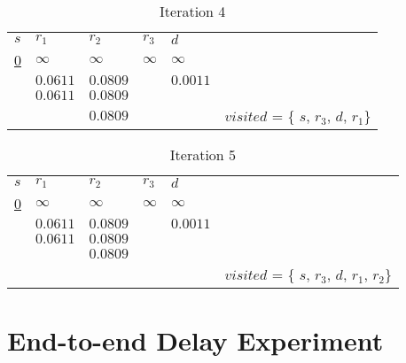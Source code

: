 \documentclass[conference]{IEEEtran}
\begin{document}
\begin{table}[!htbp]
\caption{Iteration 4}
\begin{tabular}{|l|l|l|l|l|l}
\cline{1-5}
$s$     & $r_1$          & $r_2$    & $r_3$            & $d$            &                                         \\ \cline{1-5}
{\ul 0} & $\infty$       & $\infty$ & $\infty$         & $\infty$       &                                         \\ \cline{1-5}
        & $0.0611$       & $0.0809$ & {\ul $0.000541$} & $0.0011$       &                                         \\ \cline{1-5}
        & $0.0611$       & $0.0809$ &                  & {\ul $0.0011$} &                                         \\ \cline{1-5}
        & {\ul $0.0611$} & $0.0809$ &                  & {\ul }         & $visited$ = \{ $s$, $r_3$, $d$, $r_1$\} \\ \cline{1-5}
\end{tabular}
\end{table}


\begin{table}[!htbp]
\caption{Iteration 5}
\begin{tabular}{|l|l|l|l|l|l}
\cline{1-5}
$s$     & $r_1$          & $r_2$          & $r_3$            & $d$            &                                                \\ \cline{1-5}
{\ul 0} & $\infty$       & $\infty$       & $\infty$         & $\infty$       &                                                \\ \cline{1-5}
        & $0.0611$       & $0.0809$       & {\ul $0.000541$} & $0.0011$       &                                                \\ \cline{1-5}
        & $0.0611$       & $0.0809$       &                  & {\ul $0.0011$} &                                                \\ \cline{1-5}
        & {\ul $0.0611$} & $0.0809$       &                  & {\ul }         &                                                \\ \cline{1-5}
        &                & {\ul $0.0809$} &                  &                & $visited$ = \{ $s$, $r_3$, $d$, $r_1$, $r_2$\} \\ \cline{1-5}
\end{tabular}
\end{table}


\section{End-to-end Delay Experiment}
\end{document}
